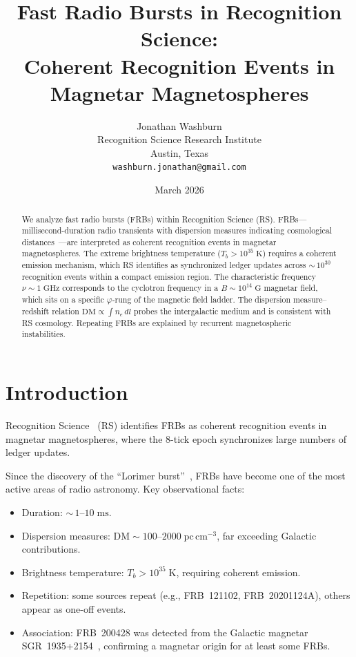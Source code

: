 \documentclass[12pt,a4paper]{article}
\title{Fast Radio Bursts in Recognition Science:\\
Coherent Recognition Events in Magnetar Magnetospheres}
\author{Jonathan Washburn\\
Recognition Science Research Institute\\
Austin, Texas\\
\texttt{washburn.jonathan@gmail.com}}
\date{March 2026}
\theoremstyle{definition}
\theoremstyle{remark}
\begin{document}
\maketitle

\begin{abstract}
We analyze fast radio bursts (FRBs) within Recognition Science (RS).
FRBs---millisecond-duration radio transients with dispersion measures
indicating cosmological distances~\cite{Lorimer2007, Petroff2019}---are
interpreted as coherent recognition events in magnetar
magnetospheres.  The extreme brightness temperature
($T_b > 10^{35}\;\mathrm{K}$) requires a coherent emission
mechanism, which RS identifies as synchronized ledger updates
across ${\sim}\,10^{30}$ recognition events within a compact
emission region.  The characteristic frequency
$\nu \sim 1\;\mathrm{GHz}$ corresponds to the cyclotron frequency
in a $B \sim 10^{14}\;\mathrm{G}$ magnetar field, which sits on a
specific $\varphi$-rung of the magnetic field ladder.  The
dispersion measure--redshift relation
$\mathrm{DM} \propto \int n_e\,dl$ probes the intergalactic medium
and is consistent with RS cosmology.  Repeating FRBs are explained
by recurrent magnetospheric instabilities.
\end{abstract}

\section{Introduction}
\label{sec:intro}

Recognition Science~\cite{RS_Axioms} (RS) identifies FRBs as coherent
recognition events in magnetar magnetospheres, where the 8-tick epoch
synchronizes large numbers of ledger updates.

Since the discovery of the ``Lorimer burst''~\cite{Lorimer2007},
FRBs have become one of the most active areas of radio astronomy.
Key observational facts:
\begin{itemize}
  \item Duration: ${\sim}\,1$--$10\;\mathrm{ms}$.
  \item Dispersion measures: $\mathrm{DM} \sim 100$--$2000\;
  \mathrm{pc\,cm^{-3}}$, far exceeding Galactic contributions.
  \item Brightness temperature: $T_b > 10^{35}\;\mathrm{K}$,
  requiring coherent emission.
  \item Repetition: some sources repeat (e.g., FRB~121102,
  FRB~20201124A), others appear as one-off events.
  \item Association: FRB~200428 was detected from the Galactic
  magnetar SGR~1935+2154~\cite{CHIME2020}, confirming a magnetar
  origin for at least some FRBs.
\end{itemize}
\end{document}
